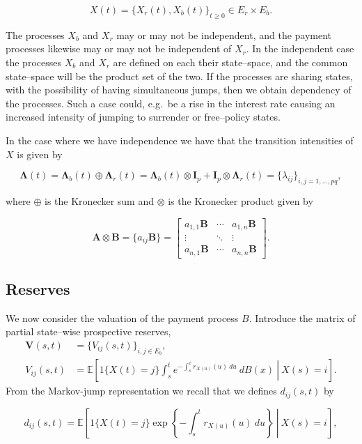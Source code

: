 \documentclass[a4paper,10pt,openany]{book}
\begin{document}
\[
X(t)=\{X_r(t),X_b(t)\}_{t\ge 0}\in E_r\times E_b.
\]

The processes \(X_b\) and \(X_r\) may or may not be independent, and the payment processes likewise may or may not be independent of \(X_r\). In the independent case the processes \(X_b\) and \(X_r\) are defined on each their state--space, and the common state--space will be the product set of the two. If the processes are sharing states, with the possibility of having simultaneous jumps, then we obtain dependency of the processes. Such a case could, e.g.~be a rise in the interest rate causing an increased intensity of jumping to surrender or free--policy states.

In the case where we have independence we have that the transition intensities of \(X\) is given by

\[
\mathbf \Lambda(t)=\mathbf \Lambda_b(t)\oplus \mathbf\Lambda_r(t)=\mathbf \Lambda_b(t)\otimes \mathbf I_p+\mathbf I_p \otimes \mathbf \Lambda_r(t)=\{\lambda_{ij}\}_{i,j=1,...,pq},
\]

where \(\oplus\) is the Kronecker sum and \(\otimes\) is the Kronecker product given by

\[
\mathbf A\otimes \mathbf B=\{a_{ij}\mathbf B\}=\begin{bmatrix}
a_{1,1}\mathbf B & \cdots & a_{1,n}\mathbf B\\
\vdots & \ddots & \vdots\\
a_{n,1}\mathbf B & \cdots & a_{n,n}\mathbf B
\end{bmatrix}.
\]

\hypertarget{reserves}{%
\subsection{Reserves}\label{reserves}}

We now consider the valuation of the payment process \(B\). Introduce the matrix of partial state--wise prospective reserves,
\begin{align*}
\mathbf V(s,t)&=\{V_{ij}(s,t)\}_{i,j\in E_b},\\
V_{ij}(s,t)&=\mathbb E\left[\left.1\{X(t)=j\}\int_s^te^{-\int_s^xr_{X(u)}(u)\ du}\ dB(x) \ \right\vert\ X(s)=i\right].
\end{align*}
From the Markov-jump representation we recall that we defines \(d_{ij}(s,t)\) by

\[
d_{ij}(s,t)=\mathbb E\left[\left.1\{X(t)=j\}\exp\left\{-\int_s^tr_{X(u)}(u)\ du\right\} \ \right\vert\ X(s)=i\right],
\]
\end{document}
